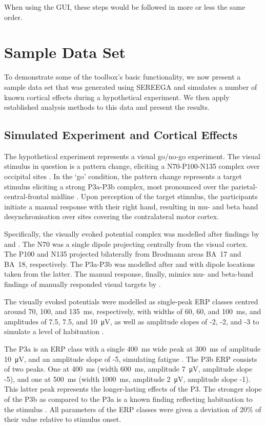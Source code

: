 When using the GUI, these steps would be followed in more or less the same order.


\section{Sample Data Set}

To demonstrate some of the toolbox's basic functionality, we now present a sample data set that was generated using SEREEGA and simulates a number of known cortical effects during a hypothetical experiment. We then apply established analysis methods to this data and present the results.


\subsection{Simulated Experiment and Cortical Effects}

The hypothetical experiment represents a visual go/no-go experiment. The visual stimulus in question is a pattern change, eliciting a N70-P100-N135 complex over occipital sites \cite{pratt2011sensoryerp}. In the `go' condition, the pattern change represents a target stimulus eliciting a strong P3a-P3b complex, most pronounced over the parietal-central-frontal midline \cite{polich2007p300}. Upon perception of the target stimulus, the participants initiate a manual response with their right hand, resulting in mu- and beta band desynchronisation over sites covering the contralateral motor cortex.

Specifically, the visually evoked potential complex was modelled after findings by  and . The N70 was a single dipole projecting centrally from the visual cortex. The P100 and N135 projected bilaterally from Brodmann areas BA~17 and BA~18, respectively. The P3a-P3b was modelled after  and  with dipole locations taken from the latter. The manual response, finally, mimics mu- and beta-band findings of manually responded visual targets by .

The visually evoked potentials were modelled as single-peak ERP classes centred around 70, 100, and 135~ms, respectively, with widths of 60, 60, and 100~ms, and amplitudes of 7.5, 7.5, and 10~\si{\micro\volt}, as well as amplitude slopes of -2, -2, and -3 to simulate a level of habituation \cite{pratt2011sensoryerp}.

The P3a is an ERP class with a single 400~ms wide peak at 300~ms of amplitude 10~\si{\micro\volt}, and an amplitude slope of -5, simulating fatigue \cite{polich2007p300}. The P3b ERP consists of two peaks. One at 400~ms (width 600~ms, amplitude 7~\si{\micro\volt}, amplitude slope -5), and one at 500~ms (width 1000~ms, amplitude 2~\si{\micro\volt}, amplitude slope -1). This latter peak represents the longer-lasting effects of the P3. The stronger slope of the P3b as compared to the P3a is a known finding reflecting habituation to the stimulus \cite{polich2007p300}. All parameters of the ERP classes were given a deviation of 20\% of their value relative to stimulus onset.

